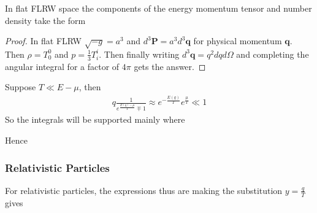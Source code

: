 \documentclass{article}
\begin{document}
\begin{prop}
In flat FLRW space the components of the energy momentum tensor and number density take the form 
\end{prop}
\begin{proof}
In flat FLRW $\sqrt{-g} = a^3$ and $d^3\bm{P} = a^3 d^3\bm{q}$ for physical momentum $\bm{q}$. Then $\rho = T^0_0$ and $p=\frac{1}{3}T^i_i$. Then finally writing $d^3\bm{q}=q^2 dq d\Omega$ and completing the angular integral for a factor of $4\pi$ gets the answer. 
\end{proof}
Suppose $T \ll E - \mu $, then 
\begin{align}\label{eq:CSM:4}
q \frac{1}{e^\frac{E(q)-\mu}{T}\mp1} \approx  e^{-\frac{E(q)}{T}}e^{\frac{\mu}{T}} \ll 1 
\end{align}
So the integrals will be supported mainly where 

Hence 
\subsubsection*{Relativistic Particles}
For relativistic particles, the expressions thus are 
making the substitution $y = \frac{q}{T}$ gives 
\end{document}
